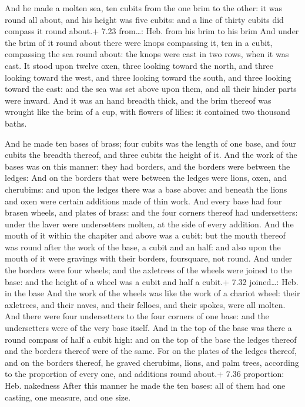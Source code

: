  And he made a molten sea, ten cubits from the one brim
to the other: it was round all about, and his height was five cubits:
and a line of thirty cubits did compass it round about.+ 7.23
from\ldots: Heb. from his brim to his brim  And under the
brim of it round about there were knops compassing it, ten in a cubit,
compassing the sea round about: the knops were cast in two rows, when it
was cast.  It stood upon twelve oxen, three looking toward
the north, and three looking toward the west, and three looking toward
the south, and three looking toward the east: and the sea was set above
upon them, and all their hinder parts were inward.  And it
was an hand breadth thick, and the brim thereof was wrought like the
brim of a cup, with flowers of lilies: it contained two thousand baths.

 And he made ten bases of brass; four cubits was the
length of one base, and four cubits the breadth thereof, and three
cubits the height of it.  And the work of the bases was on
this manner: they had borders, and the borders were between the ledges:
 And on the borders that were between the ledges were
lions, oxen, and cherubims: and upon the ledges there was a base above:
and beneath the lions and oxen were certain additions made of thin work.
 And every base had four brasen wheels, and plates of
brass: and the four corners thereof had undersetters: under the laver
were undersetters molten, at the side of every addition. 
And the mouth of it within the chapiter and above was a cubit: but the
mouth thereof was round after the work of the base, a cubit and an half:
and also upon the mouth of it were gravings with their borders,
foursquare, not round.  And under the borders were four
wheels; and the axletrees of the wheels were joined to the base: and the
height of a wheel was a cubit and half a cubit.+ 7.32 joined\ldots: Heb.
in the base  And the work of the wheels was like the work
of a chariot wheel: their axletrees, and their naves, and their felloes,
and their spokes, were all molten.  And there were four
undersetters to the four corners of one base: and the undersetters were
of the very base itself.  And in the top of the base was
there a round compass of half a cubit high: and on the top of the base
the ledges thereof and the borders thereof were of the same.
 For on the plates of the ledges thereof, and on the
borders thereof, he graved cherubims, lions, and palm trees, according
to the proportion of every one, and additions round about.+ 7.36
proportion: Heb. nakedness  After this manner he made the
ten bases: all of them had one casting, one measure, and one size.

